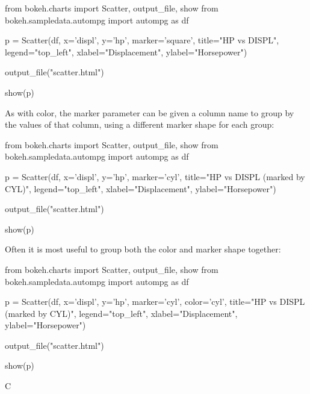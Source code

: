 from bokeh.charts import Scatter, output_file, show
from bokeh.sampledata.autompg import autompg as df

p = Scatter(df, x='displ', y='hp', marker='square',
            title="HP vs DISPL", legend="top_left",
            xlabel="Displacement", ylabel="Horsepower")

output_file("scatter.html")

show(p)
	
As with color, the marker parameter can be given a column name to group by the values of that column, using a different marker shape for each group:

from bokeh.charts import Scatter, output_file, show
from bokeh.sampledata.autompg import autompg as df

p = Scatter(df, x='displ', y='hp', marker='cyl',
            title="HP vs DISPL (marked by CYL)", legend="top_left",
            xlabel="Displacement", ylabel="Horsepower")

output_file("scatter.html")

show(p)
	
Often it is most useful to group both the color and marker shape together:

from bokeh.charts import Scatter, output_file, show
from bokeh.sampledata.autompg import autompg as df

p = Scatter(df, x='displ', y='hp', marker='cyl', color='cyl',
            title="HP vs DISPL (marked by CYL)", legend="top_left",
            xlabel="Displacement", ylabel="Horsepower")

output_file("scatter.html")

show(p)
	
C
